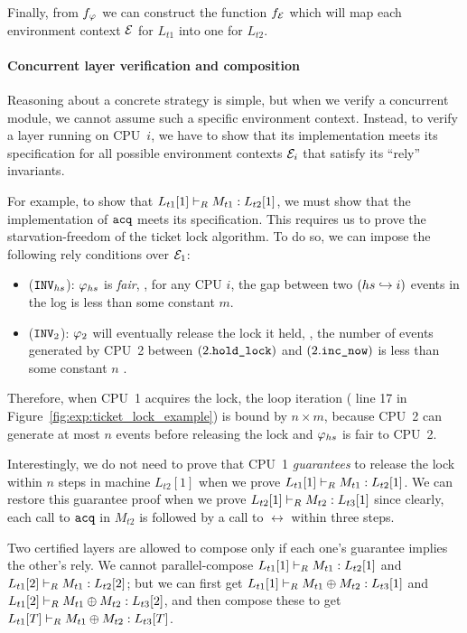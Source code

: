 Finally, from $f_{\varphi_{}}$ we can construct the function
$f_{\mathcal{E}}$ which will map each environment context $\mathcal{E}$ for
$L_{t1}$ into one for $L_{t2}$.

\paragraph{Concurrent layer verification and composition}
Reasoning about a concrete strategy is simple, but when we verify
a concurrent module, we cannot assume such a specific environment context.
Instead, to verify
a layer running on CPU~$i$, we have to show that its implementation
meets its specification for all possible environment contexts
$\mathcal{E}_i$ that satisfy its ``rely'' invariants.

For example, to show that $L_{t1}[1] \vdash_{R} M_{t1} : L_{t2}[1]$, we must
show that the implementation of ${\texttt{acq}}$ meets its specification.
This requires us to prove the starvation-freedom of the ticket
lock algorithm. To do so, we can impose the following rely conditions
over $\mathcal{E}_1$:
\begin{itemize} \itemsep 0pt
\item (${\texttt{INV}}_{hs}$):  $\varphi_{hs}$ is \emph{fair}, \ie,
  for any CPU $i$, the gap between two $(hs \hookrightarrow i)$ events
  in the log is less than some constant $m$.
\item (${\texttt{INV}}_{2}$):  $\varphi_{2}$ will eventually release the
  lock it held, \ie, the number of events generated by CPU~2
  between $(2.{\texttt{hold\_lock}})$ and $(2.{\texttt{inc\_now}})$   is less
  than some constant $n$ .
\end{itemize}
Therefore, when CPU~1 acquires the lock, the loop iteration (\cf
line 17 in Figure~\ref{fig:exp:ticket_lock_example}) is bound by
$n \times m$, because CPU~2 can generate at most $n$ events before
releasing the lock and $\varphi_{hs}$ is fair to CPU~2.

Interestingly, we do not need
to prove that CPU~1 \emph{guarantees} to release the lock within $n$
steps in machine $L_{t2}[1]$
when we prove $L_{t1}[1] \vdash_{R} M_{t1} : L_{t2}[1]$.  We can restore
this guarantee proof when we prove $L_{t2}[1] \vdash_{R} M_{t2} : L_{t3}[1]$
since clearly, each call to ${\texttt{acq}}$ in $M_{t2}$ is followed by a call to
$\rel$ within three steps.

Two certified layers are allowed to compose only if each one's guarantee
implies the other's rely. We cannot parallel-compose
$L_{t1}[1] \vdash_{R} M_{t1} : L_{t2}[1]$ and 
$L_{t1}[2] \vdash_{R} M_{t1} : L_{t2}[2]$;
but we can first get $L_{t1}[1] \vdash_{R} M_{t1}\oplus{}M_{t2} : L_{t3}[1]$ and
$L_{t1}[2] \vdash_{R} M_{t1}\oplus{}M_{t2} : L_{t3}[2]$, and then compose these to
get $L_{t1}[T] \vdash_{R} M_{t1}\oplus{}M_{t2} : L_{t3}[T]$.

